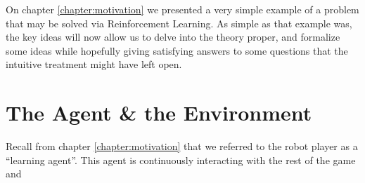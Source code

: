 \label{chapter:ReinforcementLearning}

On chapter \ref{chapter:motivation} we presented a very simple 
example of a problem that may be solved via Reinforcement 
Learning. As simple as that example was, the key ideas will now 
allow us to delve into the theory proper, and formalize some 
ideas while hopefully giving satisfying answers to some 
questions that the intuitive treatment might have left open.

\section{The Agent \& the Environment}
Recall from chapter \ref{chapter:motivation} that we referred 
to the robot player as a ``learning agent''. This agent is 
continuously interacting with the rest of the game and 
